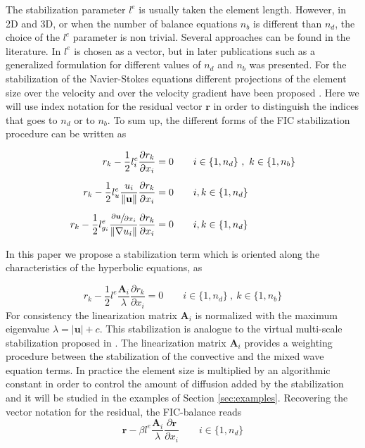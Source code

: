 \documentclass[a4paper,12pt]{elsarticle}
\newcommand{\pder}[2]{\frac{\partial#1}{\partial#2}}
\newcommand{\abs}[1]{\lvert#1\rvert}
\newcommand{\norm}[1]{\lVert#1\rVert}
\begin{document}
The stabilization parameter $l^e$ is usually taken the element length. However, in 2D and 3D, or when the number of balance equations $n_b$ is different than $n_d$, the choice of the $l^e$ parameter is non trivial.
Several approaches can be found in the literature. In \cite{onate1998} $l^e$ is chosen as a vector, but in later publications such as \cite{onate2001} a generalized formulation for different values of $n_d$ and $n_b$ was presented.
For the stabilization of the Navier-Stokes equations different projections of the element size over the velocity and over the velocity gradient have been proposed \cite{cotela2016}. Here we will use index notation for the residual vector $\mathbf{r}$ in order to distinguish the indices that goes to $n_d$ or to $n_b$. To sum up, the different forms of the FIC stabilization procedure can be written as

\begin{subequations}
\begin{align}
r_{k} - \frac{1}{2}l^e_i\pder{r_k}{x_i} &= 0
    \qquad i\in\{1,n_d\} \ ,\ k\in\{1,n_b\}\\[5pt]
r_{k} - \frac{1}{2}l^e_u\frac{u_i}{\norm{\mathbf{u}}}\pder{r_k}{x_i} &= 0
    \qquad i,k\in\{1,n_d\}\\[5pt]
r_{k} - \frac{1}{2}l^e_{g_i}\frac{\sfrac{\partial\mathbf{u}}{\partial x_i}}{\norm{\nabla u_i}}\pder{r_k}{x_i} &= 0
    \qquad i,k\in\{1,n_d\}
\end{align}
\end{subequations}

In this paper we propose a stabilization term which is oriented along the characteristics of the hyperbolic equations, as

\begin{equation} \label{fic_sw}
r_{k} - \frac{1}{2}l^e\frac{\mathbf{A}_i}{\lambda}\pder{r_k}{x_i} = 0
    \qquad i\in\{1,n_d\} \ ,\ k\in\{1,n_b\}
\end{equation}
For consistency the linearization matrix $\mathbf{A}_i$ is normalized with the maximum eigenvalue $\lambda=\abs{\mathbf{u}} + c$. This stabilization is analogue to the virtual multi-scale stabilization proposed in \cite{codina2008b}. The linearization matrix $\mathbf{A}_i$ provides a weighting procedure between the stabilization of the convective and the mixed wave equation terms. In practice the element size is multiplied by an algorithmic constant in order to control the amount of diffusion added by the stabilization and it will be studied in the examples of Section \ref{sec:examples}. Recovering the vector notation for the residual, the FIC-balance reads
\begin{equation} \label{fic_sw_beta}
\mathbf{r} - \beta l^e\frac{\mathbf{A}_i}{\lambda}\pder{\mathbf{r}}{x_i}
    \qquad i\in\{1,n_d\}
\end{equation}
\end{document}
